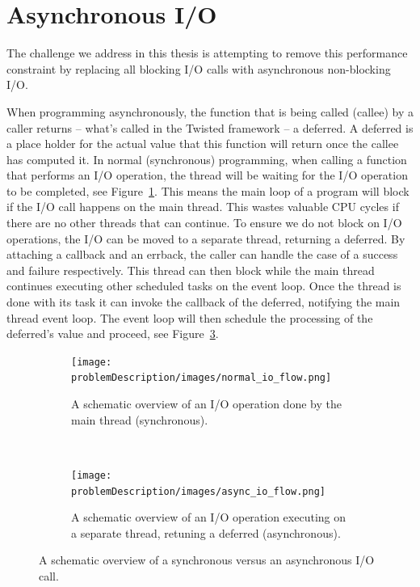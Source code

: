 \section{Asynchronous I/O}
\label{sec:async-programming}

The challenge we address in this thesis is attempting to remove this performance constraint by replacing all blocking I/O calls with asynchronous non-blocking I/O. 

When programming asynchronously, the function that is being called (callee) by a caller returns -- what's called in the Twisted framework -- a deferred.
A deferred is a place holder for the actual value that this function will return once the callee has computed it.
In normal (synchronous) programming, when calling a function that performs an I/O operation, the thread will be waiting for the I/O operation to be completed, see Figure~\ref{fig:normal_io_flow}.
This means the main loop of a program will block if the I/O call happens on the main thread.
This wastes valuable CPU cycles if there are no other threads that can continue.
To ensure we do not block on I/O operations, the I/O can be moved to a separate thread, returning a deferred.
By attaching a callback and an errback, the caller can handle the case of a success and failure respectively.
This thread can then block while the main thread continues executing other scheduled tasks on the event loop.
Once the thread is done with its task it can invoke the callback of the deferred, notifying the main thread event loop.
The event loop will then schedule the processing of the deferred's value and proceed, see Figure~\ref{fig:async_io_flow}.

\begin{figure}
	\centering
	\begin{subfigure}[b]{\textwidth}
		\texttt{[image: problemDescription/images/normal\_io\_flow.png]}
		\caption{A schematic overview of an I/O operation done by the main thread (synchronous).}
		\label{fig:normal_io_flow}
	\end{subfigure}
	~ %
	\begin{subfigure}[b]{\textwidth}
		\texttt{[image: problemDescription/images/async\_io\_flow.png]}
		\caption{A schematic overview of an I/O operation executing on a separate thread, retuning a deferred (asynchronous).}
		\label{fig:async_io_flow}
	\end{subfigure}
	\caption{A schematic overview of a synchronous versus an asynchronous I/O call.}
\end{figure}

